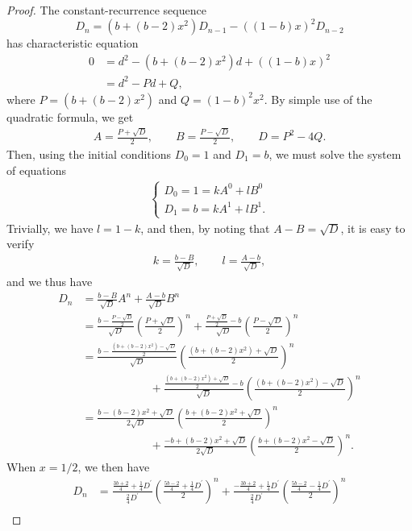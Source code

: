 \documentclass[11pt, letterpaper]{article}
\numberwithin{equation}{section}
\begin{document}
\begin{proof}
The constant-recurrence sequence
$$ D_n= \left(b + (b-2)x^2\right) D_{n-1} - \left((1-b)x\right)^2 D_{n-2}$$
has characteristic equation 
\begin{align*}
0 &= d^2 - \left(b + (b-2)x^2\right) d + \left((1-b)x\right)^2\\
&= d^2 - P d + Q, 
\end{align*}
where $P = \left(b + (b-2)x^2 \right)$ and $Q = (1-b)^2x^2$. By simple use of the quadratic formula, we get 
\begin{align*}
A = \frac{P+\sqrt{D}}{2}, \qquad B = \frac{P - \sqrt{D}}{2}, \qquad D = P^2 - 4Q.
\end{align*}
Then, using the initial conditions $D_0 = 1$ and $D_1 = b$, we must solve the system of equations 
\begin{align*}
\begin{cases}
D_0 = 1 = k A^0 + l B^0 \\
D_1 = b =  k A^1 + l B^1.
\end{cases}
\end{align*}
Trivially, we have $l = 1-k$, and then, by noting that $A-B = \sqrt{D}$, it is easy to verify 
\begin{align*}
k = \frac{b - B}{\sqrt{D}}, \qquad
l = \frac{A - b}{\sqrt{D}},
\end{align*}
and we thus have
\begin{align*}
D_n &= \frac{b - B}{\sqrt{D}}A^n + \frac{A - b}{\sqrt{D}}B^n \\
&= \frac{b - \frac{P - \sqrt{D}}{2}}{\sqrt{D}}\left(\frac{P+\sqrt{D}}{2}\right)^n + \frac{\frac{P+\sqrt{D}}{2} - b}{\sqrt{D}}\left(\frac{P - \sqrt{D}}{2}\right)^n \\
&= \frac{b - \frac{\left(b + (b-2)x^2 \right) - \sqrt{D}}{2}}{\sqrt{D}}\left(\frac{\left(b + (b-2)x^2 \right)+\sqrt{D}}{2}\right)^n  \\
&\qquad\qquad\qquad + \frac{\frac{\left(b + (b-2)x^2 \right)+\sqrt{D}}{2} - b}{\sqrt{D}}\left(\frac{\left(b + (b-2)x^2 \right) - \sqrt{D}}{2}\right)^n \\
&= \frac{b - (b-2)x^2 + \sqrt{D}}{2\sqrt{D}}\left(\frac{b + (b-2)x^2 +\sqrt{D}}{2}\right)^n  \\
&\qquad\qquad\qquad + \frac{-b + (b-2)x^2 +\sqrt{D}}{2\sqrt{D}}\left(\frac{b + (b-2)x^2 - \sqrt{D}}{2}\right)^n.
\end{align*}
When $x=1/2$, we then have 
\begin{align}
D_n &=\frac{\frac{3b + 2}{4}+ \frac{1}{4}D^\prime}{\frac{2}{4}D^\prime}\left(\frac{\frac{5b - 2}{4} +\frac{1}{4}D^\prime}{2}\right)^n +  \frac{-\frac{3b + 2}{4} +\frac{1}{4}D^\prime}{\frac{2}{4}D^\prime}\left(\frac{\frac{5b - 2}{4}  - \frac{1}{4}D^\prime}{2}\right)^n \nonumber \\

\end{align}
\end{proof}
\end{document}
